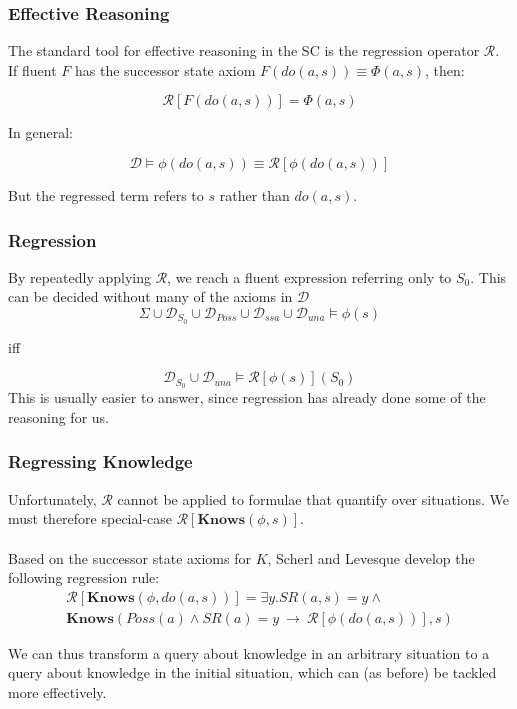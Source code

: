 \documentclass{beamer}
\begin{document}
\begin{frame}
\frametitle{Effective Reasoning}
The standard tool for effective reasoning in the SC is the
regression operator $\mathcal{R}$. If fluent $F$ has the successor state axiom
$F(do(a,s)) \equiv \Phi(a,s)$, then:

\[ \mathcal{R}[F(do(a,s))] = \Phi(a,s) \]

\pause
In general:

\[  \mathcal{D} \models \phi(do(a,s)) \equiv \mathcal{R}[\phi(do(a,s))] \]

But the regressed term refers to $s$ rather than $do(a,s)$.

\end{frame}

\begin{frame}
\frametitle{Regression}
By repeatedly applying $\mathcal{R}$, we reach a fluent expression referring
only to $S_0$.  This can be decided without many of the axioms in $\mathcal{D}$
\begin{equation*}
  \Sigma \cup \mathcal{D}_{S_0} \cup \mathcal{D}_{Poss} \cup \mathcal{D}_{ssa} \cup \mathcal{D}_{una} \models \phi(s)
\end{equation*}
\begin{center}
iff
\end{center}
\begin{equation*}
  \mathcal{D}_{S_0} \cup \mathcal{D}_{una} \models \mathcal{R}[\phi(s)](S_0)
\end{equation*}
This is usually easier to answer, since regression has already done some
of the reasoning for us.
\end{frame}

\begin{frame}
\frametitle{Regressing Knowledge}
Unfortunately, $\mathcal{R}$ cannot be applied to formulae that quantify
over situations.  We must therefore special-case
$\mathcal{R}[\mathbf{Knows}(\phi,s)]$.
\ \\
\ \\
Based on the successor state axioms for $K$, Scherl and Levesque develop
the following regression rule:
\begin{multline*}
  \mathcal{R}[\mathbf{Knows}(\phi,do(a,s))] =
    \exists y . SR(a,s) = y \wedge \\
    \mathbf{Knows}(Poss(a) \wedge SR(a)=y\ \rightarrow\ \mathcal{R}[\phi(do(a,s))],s)
\end{multline*}

We can thus transform a query about knowledge in an arbitrary situation to
a query about knowledge in the initial situation, which can (as before) be
tackled more effectively.

\end{frame}
\end{document}
